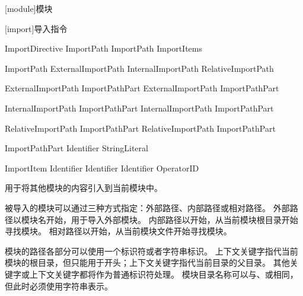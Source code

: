 
[module]{模块}

[import]{导入指令}

\begin{bnf}{ImportDirective}
     ImportPath \terminal{;} \br
     ImportPath \terminal{:} ImportItems \terminal{;}
\end{bnf}

\begin{bnf}{ImportPath}
    ExternalImportPath \br
    InternalImportPath \br
    RelativeImportPath
\end{bnf}

\begin{bnf}{ExternalImportPath}
    ImportPathPart \br
    ExternalImportPath  ImportPathPart
\end{bnf}

\begin{bnf}{InternalImportPath}
      ImportPathPart \br
    InternalImportPath  ImportPathPart
\end{bnf}

\begin{bnf}{RelativeImportPath}
      ImportPathPart \br
    RelativeImportPath  ImportPathPart
\end{bnf}

\begin{bnf}{ImportPathPart}
    Identifier \br
    StringLiteral \br
\end{bnf}

\begin{bnf}{ImportItem}
    \terminal{*} \br
     \br
    Identifier \br
    Identifier  Identifier \br
    OperatorID
\end{bnf}

\pnum
{}用于将其他模块的内容引入到当前模块中。

\pnum
被导入的模块可以通过三种方式指定：外部路径、内部路径或相对路径。
外部路径以模块名开始，用于导入外部模块。
内部路径以开始，从当前模块根目录开始寻找模块。
相对路径以开始，从当前模块文件开始寻找模块。

\pnum
模块的路径各部分可以使用一个标识符或者字符串标识。
上下文关键字指代当前模块的根目录，但只能用于开头；上下文关键字指代当前目录的父目录。
其他关键字或上下文关键字都将作为普通标识符处理。
模块目录名称可以与、或相同，但此时必须使用字符串表示。


